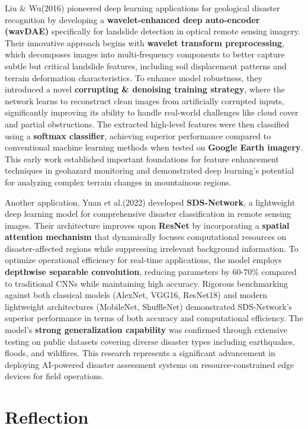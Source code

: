 \documentclass[
  letterpaper,
]{scrbook}
\begin{document}
Liu \& Wu(2016) pioneered deep learning applications for geological
disaster recognition by developing a \textbf{wavelet-enhanced deep
auto-encoder (wavDAE)} specifically for landslide detection in optical
remote sensing imagery. Their innovative approach begins with
\textbf{wavelet transform preprocessing}, which decomposes images into
multi-frequency components to better capture subtle but critical
landslide features, including soil displacement patterns and terrain
deformation characteristics. To enhance model robustness, they
introduced a novel \textbf{corrupting \& denoising training strategy},
where the network learns to reconstruct clean images from artificially
corrupted inputs, significantly improving its ability to handle
real-world challenges like cloud cover and partial obstructions. The
extracted high-level features were then classified using a
\textbf{softmax classifier}, achieving superior performance compared to
conventional machine learning methods when tested on \textbf{Google
Earth imagery}. This early work established important foundations for
feature enhancement techniques in geohazard monitoring and demonstrated
deep learning's potential for analyzing complex terrain changes in
mountainous regions.

Another application, Yuan et al.(2022) developed \textbf{SDS-Network}, a
lightweight deep learning model for comprehensive disaster
classification in remote sensing images. Their architecture improves
upon \textbf{ResNet} by incorporating a \textbf{spatial attention
mechanism} that dynamically focuses computational resources on
disaster-affected regions while suppressing irrelevant background
information. To optimize operational efficiency for real-time
applications, the model employs \textbf{depthwise separable
convolution}, reducing parameters by 60-70\% compared to traditional
CNNs while maintaining high accuracy. Rigorous benchmarking against both
classical models (AlexNet, VGG16, ResNet18) and modern lightweight
architectures (MobileNet, ShuffleNet) demonstrated SDS-Network's
superior performance in terms of both accuracy and computational
efficiency. The model's \textbf{strong generalization capability} was
confirmed through extensive testing on public datasets covering diverse
disaster types including earthquakes, floods, and wildfires. This
research represents a significant advancement in deploying AI-powered
disaster assessment systems on resource-constrained edge devices for
field operations.

\section{Reflection}\label{reflection-5}
\end{document}
